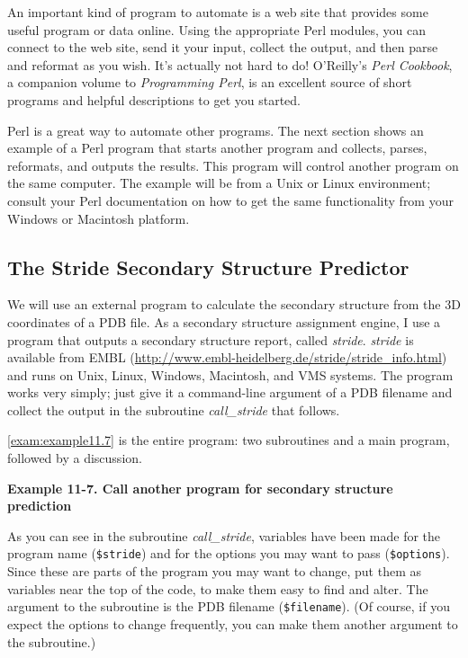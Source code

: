 An important kind of program to automate is a web site that provides some useful program or data online. Using the appropriate Perl modules, you can connect to the web site, send it your input, collect the output, and then parse and reformat as you wish. It's actually not hard to do!  O'Reilly's \textit{Perl Cookbook}, a companion volume to \textit{Programming Perl}, is an excellent source of short programs and helpful descriptions to get you started.

Perl is a great way to automate other programs. The next section shows an example of a Perl program that starts another program and collects, parses, reformats, and outputs the results. This program will control another program on the same computer. The example will be from a Unix or Linux environment; consult your Perl documentation on how to get the same functionality from your Windows or Macintosh platform. 

\subsection{The Stride Secondary Structure Predictor}
We will use an external program to calculate the secondary structure from the 3D coordinates of a PDB file. As a secondary structure assignment engine, I use a program that outputs a secondary structure report, called \textit{stride}. \textit{stride} is available from EMBL (\href{http://www.embl-heidelberg.de/stride/stride\_info.html}{http://www.embl-heidelberg.de/stride/stride\_info.html}) and runs on Unix, Linux, Windows, Macintosh, and VMS systems. The program works very simply; just give it a command-line argument of a PDB filename and collect the output in the subroutine \textit{call\_stride} that follows.

\autoref{exam:example11.7} is the entire program: two subroutines and a main program, followed by a discussion. 

\textbf{Example 11-7. Call another program for secondary structure prediction}


As you can see in the subroutine \textit{call\_stride}, variables have been made for the program name (\verb|$stride|) and for the options you may want to pass (\verb|$options|). Since these are parts of the program you may want to change, put them as variables near the top of the code, to make them easy to find and alter. The argument to the subroutine is the PDB filename (\verb|$filename|). (Of course, if you expect the options to change frequently, you can make them another argument to the subroutine.)

